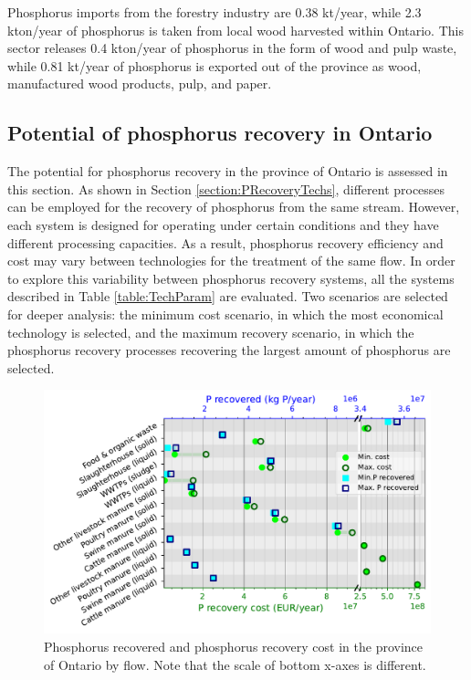 \documentclass[]{elsarticle}
\begin{document}
Phosphorus imports from the forestry industry are 0.38 kt/year, while 2.3 kton/year of phosphorus is taken from local wood harvested within Ontario. This sector releases 0.4 kton/year of phosphorus in the form of wood and pulp waste, while 0.81 kt/year of phosphorus is exported out of the province as wood, manufactured wood products, pulp, and paper.


\subsection{Potential of phosphorus recovery in Ontario}

The potential for phosphorus recovery in the province of Ontario
is assessed in this section. As shown in Section \ref{section:PRecoveryTechs}, different processes can be employed for the recovery of phosphorus from the same stream. However, each system is designed for operating under certain conditions and they have different processing capacities. As a result, phosphorus recovery efficiency and cost may vary between technologies for the treatment of the same flow. In order to explore this variability between phosphorus recovery systems, all the systems described in Table \ref{table:TechParam} are evaluated.
Two scenarios are selected for deeper analysis: the minimum cost scenario, in which the most economical technology is selected, and the maximum recovery scenario, in which the phosphorus recovery processes recovering the largest amount of phosphorus are selected.

\begin{figure}[H]
	\centering
	\includegraphics[width=0.85\linewidth, trim={0cm 0cm 0cm 0cm},clip]{Figures/Results_PlotSummary.pdf} 
	\caption{Phosphorus recovered and phosphorus recovery cost in the province of Ontario by flow. Note that the scale of bottom x-axes is different.}
	\label{fig:Results_PlotSummary}
\end{figure}
\end{document}
